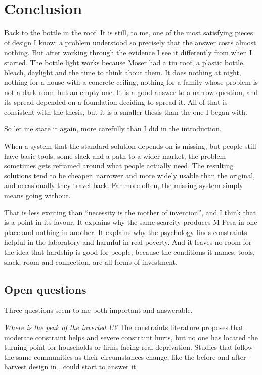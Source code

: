 \section{Conclusion}
\label{sec:conclusion}

Back to the bottle in the roof. It is still, to me, one of the most
satisfying pieces of design I know: a problem understood so precisely that
the answer costs almost nothing. But after working through the evidence I see
it differently from when I started. The bottle light works because Moser had
a tin roof, a plastic bottle, bleach, daylight and the time to think about
them. It does nothing at night, nothing for a house with a concrete ceiling,
nothing for a family whose problem is not a dark room but an empty one. It is
a good answer to a narrow question, and its spread depended on a foundation
deciding to spread it. All of that is consistent with the thesis, but it is a
smaller thesis than the one I began with.

So let me state it again, more carefully than I did in the introduction.

\begin{keyidea}
When a system that the standard solution depends on is missing, but people
still have basic tools, some slack and a path to a wider market, the problem
sometimes gets reframed around what people actually need. The resulting
solutions tend to be cheaper, narrower and more widely usable than the
original, and occasionally they travel back. Far more often, the missing
system simply means going without.
\end{keyidea}

That is less exciting than ``necessity is the mother of invention'', and I
think that is a point in its favour. It explains why the same scarcity
produces M-Pesa in one place and nothing in another. It explains why the
psychology finds constraints helpful in the laboratory and harmful in real
poverty. And it leaves no room for the idea that hardship is good for people,
because the conditions it names, tools, slack, room and connection, are all
forms of investment.

\subsection{Open questions}

Three questions seem to me both important and answerable.

\emph{Where is the peak of the inverted U?} The constraints literature
proposes that moderate constraint helps and severe constraint hurts, but no one
has located the turning point for households or firms facing real
deprivation. Studies that follow the same communities as their circumstances
change, like the before-and-after-harvest design in \textcite{mani2013}, could
start to answer it.

